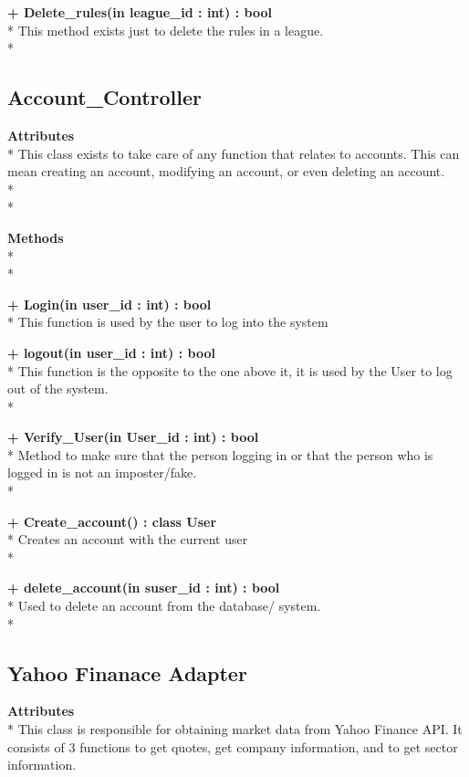 {\bfseries + Delete_rules(in league_id : int) : bool } \\*
	This method exists just to delete the rules in a league.  \\*


\subsection{Account_Controller}
{\bfseries Attributes}  \\*
This class exists to take care of any function that relates to accounts.
This can mean creating an account, modifying an account, or even deleting
an account. \\* \\*

{\bfseries Methods} \\* \\*

{\bfseries + Login(in user_id : int) : bool} \\*
	This function is used by the user to log into the system

{\bfseries + logout(in user_id : int) : bool } \\*
	This function is the opposite to the one above it, it is
    used by the User to log out of the system. \\*

{\bfseries + Verify_User(in User_id : int) : bool} \\*
	Method to make sure that the person logging in or that
    the person who is logged in is not an imposter/fake. \\*

{\bfseries + Create_account() : class User } \\*
	Creates an account with the current user  \\*

{\bfseries + delete_account(in suser_id : int) : bool } \\*
	Used to delete an account from the database/ system.   \\*

\subsection{Yahoo Finanace Adapter}
{\bfseries Attributes} \\*
This class is responsible for obtaining market data from Yahoo Finance
API.  It consists of 3 functions to get quotes, get company information,
and to get sector information.

